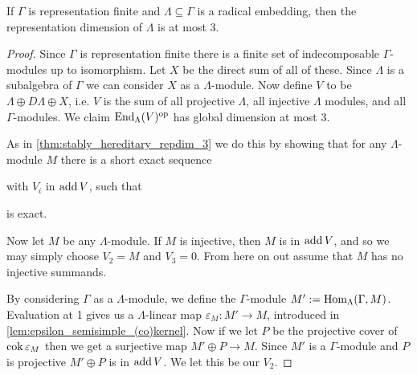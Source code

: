 \begin{theorem}
	If $\Gamma$ is representation finite and $\Lambda \subseteq \Gamma$ is a radical embedding, then the representation dimension of $\Lambda$ is at most 3.
	\begin{proof}
		Since $\Gamma$ is representation finite there is a finite set of indecomposable $\Gamma$-modules up to isomorphism. Let $X$ be the direct sum of all of these. Since $\Lambda$ is a subalgebra of $\Gamma$ we can consider $X$ as a $\Lambda$-module. Now define $V$ to be $\Lambda \oplus D\Lambda \oplus X$, i.e. $V$ is the sum of all projective $\Lambda$, all injective $\Lambda$ modules, and all $\Gamma$-modules. We claim $\operatorname{End}_\Lambda(V)^{\operatorname{op}}$ has global dimension at most 3.
		
		As in \cref{thm:stably_hereditary_repdim_3} we do this by showing that for any  $\Lambda$-module $M$ there is a short exact sequence
		\begin{center}
		\end{center}
		with $V_i$ in $\operatorname{add} V$, such that 
		\begin{center}
		\end{center}
		is exact. 
		
		Now let $M$ be any $\Lambda$-module. If $M$ is injective, then $M$ is in $\operatorname{add} V$, and so we may simply choose $V_2 = M$ and $V_3=0$. From here on out assume that $M$ has no injective summands. 
		
		By considering $\Gamma$ as a $\Lambda$-module, we define the $\Gamma$-module $M' := \operatorname{Hom}_\Lambda(\Gamma, M)$. Evaluation at 1 gives us a $\Lambda$-linear map $\varepsilon_M \colon M' \to M$, introduced in \cref{lem:epsilon_semisimple_(co)kernel}. Now if we let $P$ be the projective cover of $\operatorname{cok} \varepsilon_M$ then we get a surjective map $M' \oplus P \to M$. Since $M'$ is a $\Gamma$-module and $P$ is projective $M'\oplus P$ is in $\operatorname{add} V$. We let this be our $V_2$.
		

\end{proof}
\end{theorem}
